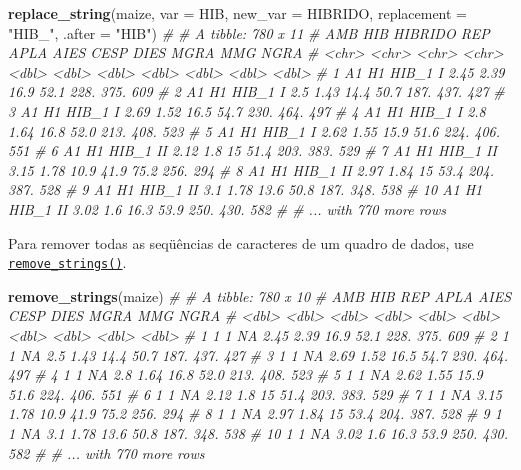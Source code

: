 \documentclass[
]{book}
\newenvironment{Shaded}{\begin{snugshade}}{\end{snugshade}}
\newcommand{\CommentTok}[1]{\textcolor[rgb]{0.56,0.35,0.01}{\textit{#1}}}
\newcommand{\DataTypeTok}[1]{\textcolor[rgb]{0.13,0.29,0.53}{#1}}
\newcommand{\KeywordTok}[1]{\textcolor[rgb]{0.13,0.29,0.53}{\textbf{#1}}}
\newcommand{\NormalTok}[1]{#1}
\newcommand{\StringTok}[1]{\textcolor[rgb]{0.31,0.60,0.02}{#1}}
\begin{document}
\begin{Shaded}
\begin{Highlighting}[]
\KeywordTok{replace_string}\NormalTok{(maize,}
               \DataTypeTok{var =}\NormalTok{ HIB,}
               \DataTypeTok{new_var =}\NormalTok{ HIBRIDO,}
               \DataTypeTok{replacement =} \StringTok{"HIB_"}\NormalTok{,}
               \DataTypeTok{.after =} \StringTok{"HIB"}\NormalTok{)}
\CommentTok{# # A tibble: 780 x 11}
\CommentTok{#    AMB   HIB   HIBRIDO REP    APLA  AIES  CESP  DIES  MGRA   MMG  NGRA}
\CommentTok{#    <chr> <chr> <chr>   <chr> <dbl> <dbl> <dbl> <dbl> <dbl> <dbl> <dbl>}
\CommentTok{#  1 A1    H1    HIB_1   I      2.45  2.39  16.9  52.1 228.   375.   609}
\CommentTok{#  2 A1    H1    HIB_1   I      2.5   1.43  14.4  50.7 187.   437.   427}
\CommentTok{#  3 A1    H1    HIB_1   I      2.69  1.52  16.5  54.7 230.   464.   497}
\CommentTok{#  4 A1    H1    HIB_1   I      2.8   1.64  16.8  52.0 213.   408.   523}
\CommentTok{#  5 A1    H1    HIB_1   I      2.62  1.55  15.9  51.6 224.   406.   551}
\CommentTok{#  6 A1    H1    HIB_1   II     2.12  1.8   15    51.4 203.   383.   529}
\CommentTok{#  7 A1    H1    HIB_1   II     3.15  1.78  10.9  41.9  75.2  256.   294}
\CommentTok{#  8 A1    H1    HIB_1   II     2.97  1.84  15    53.4 204.   387.   528}
\CommentTok{#  9 A1    H1    HIB_1   II     3.1   1.78  13.6  50.8 187.   348.   538}
\CommentTok{# 10 A1    H1    HIB_1   II     3.02  1.6   16.3  53.9 250.   430.   582}
\CommentTok{# # ... with 770 more rows}
\end{Highlighting}
\end{Shaded}

Para remover todas as seqüências de caracteres de um quadro de dados, use \href{https://tiagoolivoto.github.io/metan/reference/utils_num_str.html}{\texttt{remove\_strings()}}.

\begin{Shaded}
\begin{Highlighting}[]
\KeywordTok{remove_strings}\NormalTok{(maize)}
\CommentTok{# # A tibble: 780 x 10}
\CommentTok{#      AMB   HIB   REP  APLA  AIES  CESP  DIES  MGRA   MMG  NGRA}
\CommentTok{#    <dbl> <dbl> <dbl> <dbl> <dbl> <dbl> <dbl> <dbl> <dbl> <dbl>}
\CommentTok{#  1     1     1    NA  2.45  2.39  16.9  52.1 228.   375.   609}
\CommentTok{#  2     1     1    NA  2.5   1.43  14.4  50.7 187.   437.   427}
\CommentTok{#  3     1     1    NA  2.69  1.52  16.5  54.7 230.   464.   497}
\CommentTok{#  4     1     1    NA  2.8   1.64  16.8  52.0 213.   408.   523}
\CommentTok{#  5     1     1    NA  2.62  1.55  15.9  51.6 224.   406.   551}
\CommentTok{#  6     1     1    NA  2.12  1.8   15    51.4 203.   383.   529}
\CommentTok{#  7     1     1    NA  3.15  1.78  10.9  41.9  75.2  256.   294}
\CommentTok{#  8     1     1    NA  2.97  1.84  15    53.4 204.   387.   528}
\CommentTok{#  9     1     1    NA  3.1   1.78  13.6  50.8 187.   348.   538}
\CommentTok{# 10     1     1    NA  3.02  1.6   16.3  53.9 250.   430.   582}
\CommentTok{# # ... with 770 more rows}
\end{Highlighting}
\end{Shaded}
\end{document}
